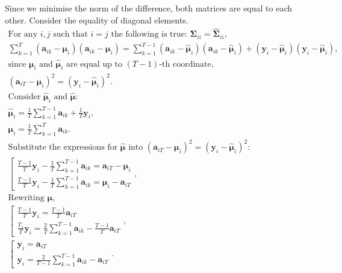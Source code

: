 \documentclass[12pt]{article}
\begin{document}
Since we minimise the norm of the difference, both matrices are equal to each other. Consider the equality of diagonal elements.
\begin{gather*}
	\text{For any } i, j \text{ such that } i = j \text{ the following is true: } \mathbf{\Sigma}_{ii} = \hat{\mathbf{\Sigma}}_{ii},\\
	\sum_{k=1}^{T}(\mathbf{a}_{ik} - \boldsymbol{\mu}_i)(\mathbf{a}_{ik}-\boldsymbol{\mu}_i) = \sum_{k=1}^{T-1}(\mathbf{a}_{ik} - \hat{\boldsymbol{\mu}}_i)(\mathbf{a}_{ik}-\hat{\boldsymbol{\mu}}_i) + (\mathbf{y}_i - \hat{\boldsymbol{\mu}}_i)(\mathbf{y}_i - \hat{\boldsymbol{\mu}}_i),\\
	\text{since } \boldsymbol{\mu}_i \text{ and } \hat{\boldsymbol{\mu}}_i \text{ are equal up to } (T-1) \text{-th coordinate,}\\
	(\mathbf{a}_{iT}-\boldsymbol{\mu}_i)^2 = (\mathbf{y}_i-\hat{\boldsymbol{\mu}}_i)^2.\\
	\text{Consider } \hat{\boldsymbol{\mu}}_i \text{ and } \hat{\boldsymbol{\mu}}:\\
	\hat{\boldsymbol{\mu}}_i = \frac{1}{T}\sum_{k=1}^{T-1}\mathbf{a}_{ik} + \frac{1}{T}\mathbf{y}_i,\\
	\boldsymbol{\mu}_i = \frac{1}{T}\sum_{k=1}^{T}\mathbf{a}_{ik}.\\
	\text{Substitute the expressions for } \hat{\boldsymbol{\mu}} \text{ into } (\mathbf{a}_{iT}-\boldsymbol{\mu}_i)^2 = (\mathbf{y}_i-\hat{\boldsymbol{\mu}}_i)^2:\\
	\left[
	\begin{array}{ll}
		\frac{T-1}{T}\mathbf{y}_i-\frac{1}{T}\sum_{k=1}^{T-1}\mathbf{a}_{ik}=\mathbf{a}_{iT}-\boldsymbol{\mu}_i
		\\[1ex]
		\frac{T-1}{T}\mathbf{y}_i-\frac{1}{T}\sum_{k=1}^{T-1}\mathbf{a}_{ik}=\boldsymbol{\mu}_i-\mathbf{a}_{iT}
	\end{array},
	\right .\\[1ex]
	\text{Rewriting } \boldsymbol{\mu} \text{,}\\
	\left[
	\begin{array}{ll}
		\frac{T-1}{T}\mathbf{y}_i = \frac{T-1}{T}\mathbf{a}_{iT}
		\\[1ex]
		\frac{T_1}{T}\mathbf{y}_i = \frac{2}{T} \sum_{k=1}^{T-1} \mathbf{a}_{ik} - \frac{T-1}{T}\mathbf{a}_{iT}
	\end{array},
	\right .\\[1ex]
	\left[
	\begin{array}{ll}
		\mathbf{y}_i = \mathbf{a}_{iT}
		\\[1ex]
		\mathbf{y}_i = \frac{2}{T-1} \sum_{k=1}^{T-1} \mathbf{a}_{ik} - \mathbf{a}_{iT}
	\end{array}.
	\right .
\end{gather*}
\end{document}
